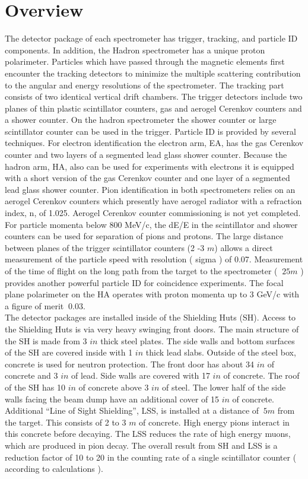 
\section{Overview}

The detector package of each spectrometer has trigger, tracking, and particle 
ID components. In addition, the Hadron spectrometer has a unique
proton polarimeter. Particles 
which have passed through the magnetic 
elements first encounter the tracking detectors to  minimize 
the multiple scattering contribution to the angular and 
energy resolutions of the spectrometer. The tracking part consists of 
two identical vertical drift chambers. The trigger detectors include two planes of
thin plastic scintillator counters, gas and aerogel Cerenkov
counters and a shower 
counter. On the hadron spectrometer the shower counter or large scintillator counter 
can be used in the trigger. Particle ID is provided by several techniques. 
For electron identification the electron arm, EA, has the gas
Cerenkov counter and two layers of a segmented 
lead glass shower counter. Because the hadron arm, HA, also can
be used for experiments with electrons 
it is equipped with a short version of the gas Cerenkov counter
and one layer of a segmented 
lead glass shower counter. Pion identification in both
spectrometers relies on an aerogel 
Cerenkov counters which presently have aerogel radiator
with a refraction index, n, of 1.025. 
Aerogel Cerenkov counter commissioning is not yet completed. For particle momenta  
below 800 MeV/c, the dE/E in the scintillator and shower counters can be used for 
separation of pions and protons. The large distance between
planes of the trigger scintillator 
counters (2 -3 $m$) allows a direct measurement of the particle
speed with resolution ( sigma )
of 0.07. Measurement of the time of flight on the long path from the target to the 
spectrometer ( $~ 25 m$ ) provides another powerful particle ID
for coincidence experiments.
The focal plane polarimeter on the HA operates with proton
momenta up to 3 GeV/c with a figure of merit $~ 0.03$.\\

The detector packages are installed inside of the Shielding Huts (SH). Access to the Shielding Huts 
is via very heavy swinging front doors. The main structure of the
SH is made from 3 $in$ thick steel plates.
The side walls and bottom surfaces of the SH are covered inside
with 1 $in$ thick lead slabs. Outside of the steel box, concrete
is used for neutron protection. 
The front door has about 34 $in$ of concrete and 3 $in$ of lead. Side walls are 
covered with 17 $in$ of concrete. The roof of the SH has 10 $in$ of concrete above 
3 $in$ of steel. The lower half of the side walls facing the beam dump have an
additional cover of 15 $in$ of concrete. Additional ``Line of Sight 
Shielding'', LSS, is installed at a distance of $~5 m$ from the
target. This consists of 2 to 3 $m$ of concrete. 
High energy pions interact in this concrete before decaying. The
LSS reduces the rate of 
high energy muons, which are produced in pion decay. The overall
result from SH and LSS is a reduction 
factor of 10 to 20 in the counting rate of a single scintillator counter
( according to calculations ). 

